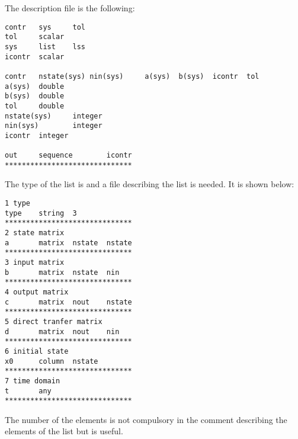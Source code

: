 The description file is the following:
\begin{verbatim}
contr   sys     tol
tol     scalar
sys     list    lss
icontr  scalar

contr   nstate(sys)	nin(sys)     a(sys)  b(sys)  icontr  tol
a(sys)  double
b(sys)  double
tol     double
nstate(sys)     integer
nin(sys)        integer
icontr  integer

out     sequence        icontr
******************************
\end{verbatim}

The type of the list is  and a file describing the list  is
needed. It is shown below:

\begin{verbatim}
1 type
type    string  3
******************************
2 state matrix
a       matrix  nstate  nstate
******************************
3 input matrix
b       matrix  nstate  nin
******************************
4 output matrix
c       matrix  nout    nstate
******************************
5 direct tranfer matrix
d       matrix  nout    nin
******************************
6 initial state
x0      column  nstate
******************************
7 time domain
t       any
******************************
\end{verbatim}

The number of the elements is not compulsory in the comment describing the
elements of the list but is useful.

